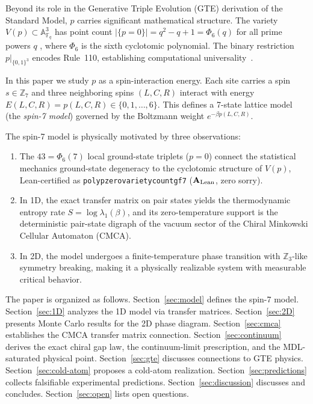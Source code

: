 \documentclass[11pt]{article}
\theoremstyle{remark}
\newcommand{\lean}[1]{%
  \penalty-100
  \begingroup\def\_{\textunderscore\allowbreak}\texttt{#1}\endgroup}
\newcommand{\CatAL}{\ensuremath{\textbf{A}_{\rm Lean}}}
\begin{document}
Beyond its role in the Generative Triple Evolution (GTE) derivation of the
Standard Model, $p$ carries
significant mathematical structure. The variety $V(p) \subset \mathbb{A}^3_{\mathbb{F}_q}$
has point count $|\{p = 0\}| = q^2 - q + 1 = \Phi_6(q)$ for all prime powers $q$
\cite{SpivackGTEPolynomialWolfram}, where $\Phi_6$ is the sixth cyclotomic polynomial.
The binary restriction $p|_{\{0,1\}^3}$ encodes Rule~110, establishing
computational universality~\cite{Cook2004}.

In this paper we study $p$ as a spin-interaction energy. Each site carries a
spin $s \in \mathbb{Z}_7$ and three neighboring spins $(L, C, R)$ interact with
energy $E(L,C,R) = p(L,C,R) \in \{0,1,\ldots,6\}$. This defines a 7-state
lattice model (the \emph{spin-7 model}) governed by the Boltzmann weight
$e^{-\beta p(L,C,R)}$.

The spin-7 model is physically motivated by three observations:
\begin{enumerate}[leftmargin=2em,itemsep=2pt]
  \item The $43 = \Phi_6(7)$ local ground-state triplets ($p = 0$) connect the
    statistical mechanics ground-state degeneracy to the cyclotomic structure of
    $V(p)$, Lean-certified as \lean{poly\_p\_zero\_variety\_count\_gf7}
    (\CatAL{}, zero sorry).
  \item In 1D, the exact transfer matrix on pair states yields the
    thermodynamic entropy rate $S = \log \lambda_1(\beta)$, and its
    zero-temperature support is the deterministic pair-state digraph of the
    vacuum sector of the Chiral Minkowski Cellular Automaton (CMCA).
  \item In 2D, the model undergoes a finite-temperature phase transition with
    $\mathbb{Z}_3$-like symmetry breaking, making it a physically realizable system
    with measurable critical behavior.
\end{enumerate}

The paper is organized as follows. Section~\ref{sec:model} defines the spin-7
model. Section~\ref{sec:1D} analyzes the 1D model via transfer matrices.
Section~\ref{sec:2D} presents Monte Carlo results for the 2D phase diagram.
Section~\ref{sec:cmca} establishes the CMCA transfer matrix connection.
Section~\ref{sec:continuum} derives the exact chiral gap law, the
continuum-limit prescription, and the MDL-saturated physical point.
Section~\ref{sec:gte} discusses connections to GTE physics. Section~\ref{sec:cold-atom}
proposes a cold-atom realization. Section~\ref{sec:predictions} collects falsifiable
experimental predictions. Section~\ref{sec:discussion} discusses and concludes.
Section~\ref{sec:open} lists open questions.
\end{document}
